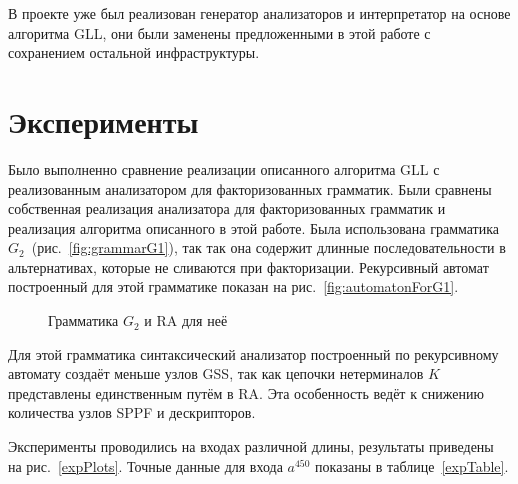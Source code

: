 \documentclass[14pt]{matmex-diploma-custom}
\begin{document}
    В проекте уже был реализован генератор анализаторов и интерпретатор
    на основе алгоритма GLL, они были заменены предложенными в этой работе с сохранением остальной инфраструктуры.

	\section{Эксперименты}
    Было выполненно сравнение реализации описанного алгоритма GLL с реализованным анализатором для факторизованных грамматик.
    Были сравнены собственная реализация анализатора для факторизованных грамматик и реализация алгоритма описанного в этой работе.
    Была использована грамматика $G_2$~(рис.~\ref{fig:grammarG1}), так так она содержит длинные последовательности 
    в альтернативах, которые не сливаются при факторизации. Рекурсивный автомат построенный для этой грамматике 
    показан на рис.~\ref{fig:automatonForG1}.
    
    \begin{figure}[ht]   
        \centering
        
        \caption{Грамматика $G_2$ и RA для неё}
    \end{figure}
    
    Для этой грамматика синтаксический анализатор построенный по рекурсивному автомату создаёт меньше узлов GSS, так как 
    цепочки нетерминалов $K$ представлены единственным путём в RA. Эта особенность ведёт к снижению количества 
    узлов SPPF и дескрипторов.
    
    Эксперименты проводились на входах различной длины, результаты приведены на рис.~\ref{expPlots}.
    Точные данные для входа $a^{450}$ показаны в таблице~\ref{expTable}.
        
\end{document}
